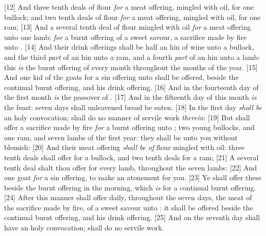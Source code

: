 [12] \textcolor[cmyk]{0.99998,1,0,0}{And three tenth deals of flour \emph{for} a meat offering, mingled with oil, for one bullock; and two tenth deals of flour \emph{for} a meat offering, mingled with oil, for one ram;}
[13] \textcolor[cmyk]{0.99998,1,0,0}{And a several tenth deal of flour mingled with oil \emph{for} a meat offering unto one lamb; \emph{for} a burnt offering of a sweet savour, a sacrifice made by fire unto .}
[14] \textcolor[cmyk]{0.99998,1,0,0}{And their drink offerings shall be half an hin of wine unto a bullock, and the third \emph{part} of an hin unto a ram, and a fourth \emph{part} of an hin unto a lamb: this \emph{is} the burnt offering of every month throughout the months of the year.}
[15] \textcolor[cmyk]{0.99998,1,0,0}{And one kid of the goats for a sin offering unto  shall be offered, beside the continual burnt offering, and his drink offering.}
[16] \textcolor[cmyk]{0.99998,1,0,0}{And in the fourteenth day of the first month \emph{is} the passover of .}
[17] \textcolor[cmyk]{0.99998,1,0,0}{And in the fifteenth day of this month \emph{is} the feast: seven days shall unleavened bread be eaten.}
[18] \textcolor[cmyk]{0.99998,1,0,0}{In the first day \emph{shall} \emph{be} an holy convocation;  shall do no manner of servile work \emph{therein}:}
[19] \textcolor[cmyk]{0.99998,1,0,0}{But  shall offer a sacrifice made by fire \emph{for} a burnt offering unto ; two young bullocks, and one ram, and seven lambs of the first year: they shall be unto you without blemish:}
[20] \textcolor[cmyk]{0.99998,1,0,0}{And their meat offering \emph{shall} \emph{be} \emph{of} flour mingled with oil: three tenth deals shall  offer for a bullock, and two tenth deals for a ram;}
[21] \textcolor[cmyk]{0.99998,1,0,0}{A several tenth deal shalt thou offer for every lamb, throughout the seven lambs:}
[22] \textcolor[cmyk]{0.99998,1,0,0}{And one goat \emph{for} a sin offering, to make an atonement for you.}
[23] \textcolor[cmyk]{0.99998,1,0,0}{Ye shall offer these beside the burnt offering in the morning, which \emph{is} for a continual burnt offering.}
[24] \textcolor[cmyk]{0.99998,1,0,0}{After this manner  shall offer daily, throughout the seven days, the meat of the sacrifice made by fire, of a sweet savour unto : it shall be offered beside the continual burnt offering, and his drink offering.}
[25] \textcolor[cmyk]{0.99998,1,0,0}{And on the seventh day  shall have an holy convocation;  shall do no servile work.}\\
